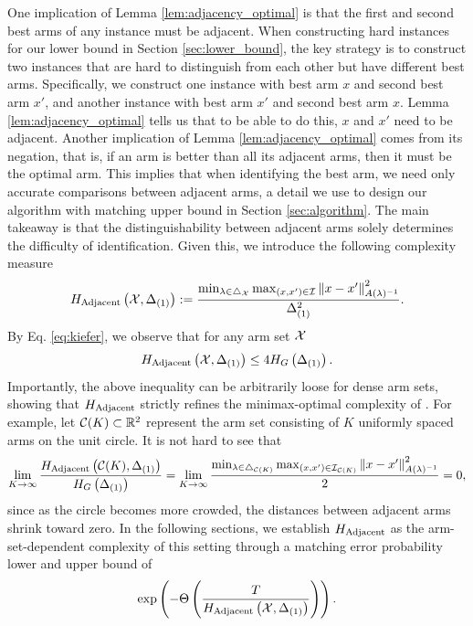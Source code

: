 One implication of Lemma \ref{lem:adjacency_optimal} is that the first and second best arms of any instance must be adjacent. When constructing hard instances for our lower bound in Section \ref{sec:lower_bound}, the key strategy is to construct two instances that are hard to distinguish from each other but have different best arms. Specifically, we construct one instance with best arm $x$ and second best arm $x'$, and another instance with best arm $x'$ and second best arm $x$. Lemma \ref{lem:adjacency_optimal} tells us that to be able to do this, $x$ and $x'$ need to be adjacent. Another implication of Lemma \ref{lem:adjacency_optimal} comes from its negation, that is, if an arm is better than all its adjacent arms, then it must be the optimal arm. This implies that when identifying the best arm, we need only accurate comparisons between adjacent arms, a detail we use to design our algorithm with matching upper bound in Section \ref{sec:algorithm}. The main takeaway is that the distinguishability between adjacent arms solely determines the difficulty of identification. Given this, we introduce the following complexity measure
\begin{equation}\label{eq:hadj-def}
    H_{\mathrm{Adjacent}}\left(\mathcal{X}, \Delta_{(1)}\right) :=\frac{\min_{\lambda\in\triangle_{\mathcal{X}}}\max_{(x, x')\in\mathcal{I}}\left\|x-x'\right\|^2_{A(\lambda)^{-1}}}{\Delta_{(1)}^2}.
    \end{equation}
 By Eq. \eqref{eq:kiefer}, we observe that for any arm set $\mathcal{X}$ \begin{equation}
     H_{\mathrm{Adjacent}}\left(\mathcal{X}, \Delta_{(1)}\right) \leq 4H_{G}\left(\Delta_{(1)}\right).
\end{equation} Importantly, the above inequality can be arbitrarily loose for dense arm sets, showing that $H_{\mathrm{Adjacent}}$ strictly refines the minimax-optimal complexity of \citet{xiong2024b}. For example, let $\mathcal{C}(K) \subset \mathbb{R}^2$ represent the arm set consisting of $K$ uniformly spaced arms on the unit circle. It is not hard to see that \begin{equation}
    \lim_{K \rightarrow \infty }\frac{H_{\mathrm{Adjacent}}\left(\mathcal{C}(K), \Delta_{(1)}\right)}{H_{G}\left(\Delta_{(1)}\right)} = \lim_{K \rightarrow \infty }\frac{\min_{\lambda\in\triangle_{\mathcal{C}(K)}}\max_{(x, x')\in\mathcal{I}_{\mathcal{C}(K)}}\left\|x-x'\right\|^2_{A(\lambda)^{-1}}}{2}= 0,
\end{equation}
since as the circle becomes more crowded, the distances between adjacent arms shrink toward zero. In the following sections, we establish $H_{\mathrm{Adjacent}}$ as the arm-set-dependent complexity of this setting through a matching error probability lower and upper bound of \begin{equation}
    \exp\left(- \Theta\left(\frac{T} {H_{\mathrm{Adjacent}}\left(\mathcal{X}, \Delta_{(1)}\right)}\right) \right).\end{equation} 